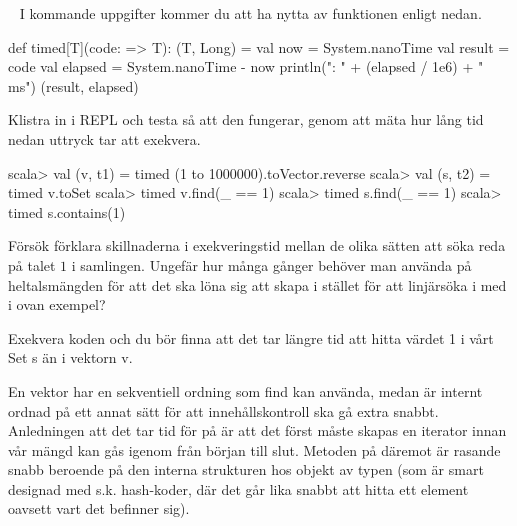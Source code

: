 \QUESTEND







\QUESTBEGIN

\Task \label{task:timed} \what~  I kommande uppgifter kommer du att ha nytta av funktionen  enligt nedan.
\begin{Code}
def timed[T](code: => T): (T, Long) = {
  val now = System.nanoTime
  val result = code
  val elapsed = System.nanoTime - now
  println("\ntime: " + (elapsed / 1e6) + " ms")
  (result, elapsed)
}
\end{Code}
\Subtask Klistra in  i REPL och testa så att den fungerar, genom att mäta hur lång tid nedan uttryck tar att exekvera.
\begin{REPL}
scala> val (v, t1) = timed{ (1 to 1000000).toVector.reverse }
scala> val (s, t2) = timed{ v.toSet }
scala> timed{ v.find(_ == 1) }
scala> timed{ s.find(_ == 1) }
scala> timed{ s.contains(1) }
\end{REPL}
\Subtask\Pen Försök förklara skillnaderna i exekveringstid mellan de olika sätten att söka reda på  talet $1$ i samlingen. Ungefär hur många gånger behöver man använda  på heltalsmängden  för att det ska löna sig att skapa  i stället för att linjärsöka i  med  i ovan exempel?


\SOLUTION


\TaskSolved \what


\SubtaskSolved
Exekvera koden och du bör finna att det tar längre tid att hitta värdet 1 i vårt Set s än i vektorn v.

\SubtaskSolved

En vektor har en sekventiell ordning som find kan använda, medan  är internt ordnad  på ett annat sätt för att innehållskontroll ska gå extra snabbt. Anledningen att det tar tid för  på  är att det först måste skapas en iterator innan vår mängd kan gås igenom från början till slut. Metoden  på  däremot är rasande snabb beroende på den interna strukturen hos objekt av typen  (som är smart designad med s.k. hash-koder, där det går lika snabbt att hitta ett element oavsett vart det befinner sig).



\QUESTEND





